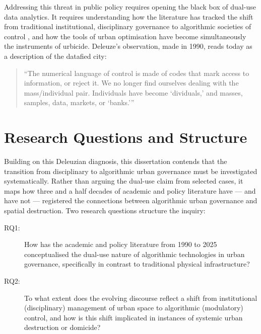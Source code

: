 \documentclass[12pt,a4paper,twoside]{report}
\begin{document}
Addressing this threat in public policy requires opening the black box of dual-use data analytics. It requires understanding how the literature has tracked the shift from traditional institutional, disciplinary governance to algorithmic societies of control \parencite{deleuze1990}, and how the tools of urban optimisation have become simultaneously the instruments of urbicide. Deleuze's observation, made in 1990, reads today as a description of the datafied city:

\begin{quote}
``The numerical language of control is made of codes that mark access to information, or reject it. We no longer find ourselves dealing with the mass/individual pair. Individuals have become `dividuals,' and masses, samples, data, markets, or `banks.''' \parencite[p.~5]{deleuze1990}
\end{quote}

\section{Research Questions and Structure}
\label{sec:research-questions}

Building on this Deleuzian diagnosis, this dissertation contends that the transition from disciplinary to algorithmic urban governance must be investigated systematically. Rather than arguing the dual-use claim from selected cases, it maps how three and a half decades of academic and policy literature have — and have not — registered the connections between algorithmic urban governance and spatial destruction. Two research questions structure the inquiry:

\begin{description}
\item[RQ1:] How has the academic and policy literature from 1990 to 2025 conceptualised the dual-use nature of algorithmic technologies in urban governance, specifically in contrast to traditional physical infrastructure?
\item[RQ2:] To what extent does the evolving discourse reflect a shift from institutional (disciplinary) management of urban space to algorithmic (modulatory) control, and how is this shift implicated in instances of systemic urban destruction or domicide?
\end{description}
\end{document}
